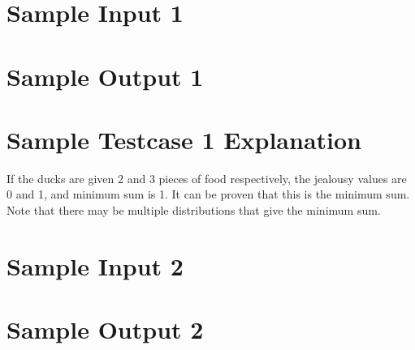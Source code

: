 \documentclass{report}
\begin{document}
\hfill \break \hfill \break

\section*{Sample Input 1}

\section*{Sample Output 1}

\section*{Sample Testcase 1 Explanation}
If the ducks are given 2 and 3 pieces of food respectively, the jealousy values are 0 and 1, and minimum sum is 1. It can be proven that this is the minimum sum. Note that there may be multiple distributions that give the minimum sum. 

\section*{Sample Input 2}

\section*{Sample Output 2}

\pagebreak
\hfill \break \hfill \break
\end{document}
